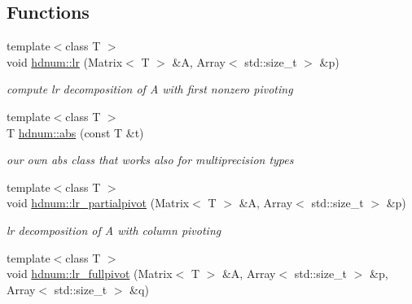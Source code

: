 \subsection*{Functions}
\begin{DoxyCompactItemize}
\item 
\hypertarget{namespacehdnum_aa6579c01f220999e670f956774bd85c7}{
{\footnotesize template$<$class T $>$ }\\void \hyperlink{namespacehdnum_aa6579c01f220999e670f956774bd85c7}{hdnum::lr} (Matrix$<$ T $>$ \&A, Array$<$ std::size\_\-t $>$ \&p)}
\label{namespacehdnum_aa6579c01f220999e670f956774bd85c7}

\begin{DoxyCompactList}\small\item\em compute lr decomposition of A with first nonzero pivoting \item\end{DoxyCompactList}\item 
\hypertarget{namespacehdnum_a9ab161adff3c1341fcf1cffb6b503a3a}{
{\footnotesize template$<$class T $>$ }\\T \hyperlink{namespacehdnum_a9ab161adff3c1341fcf1cffb6b503a3a}{hdnum::abs} (const T \&t)}
\label{namespacehdnum_a9ab161adff3c1341fcf1cffb6b503a3a}

\begin{DoxyCompactList}\small\item\em our own abs class that works also for multiprecision types \item\end{DoxyCompactList}\item 
\hypertarget{namespacehdnum_a1ddad586daab7c3757cb7049a9330f30}{
{\footnotesize template$<$class T $>$ }\\void \hyperlink{namespacehdnum_a1ddad586daab7c3757cb7049a9330f30}{hdnum::lr\_\-partialpivot} (Matrix$<$ T $>$ \&A, Array$<$ std::size\_\-t $>$ \&p)}
\label{namespacehdnum_a1ddad586daab7c3757cb7049a9330f30}

\begin{DoxyCompactList}\small\item\em lr decomposition of A with column pivoting \item\end{DoxyCompactList}\item 
\hypertarget{namespacehdnum_a18307e1ea7ffb87dff8628ccbf723545}{
{\footnotesize template$<$class T $>$ }\\void \hyperlink{namespacehdnum_a18307e1ea7ffb87dff8628ccbf723545}{hdnum::lr\_\-fullpivot} (Matrix$<$ T $>$ \&A, Array$<$ std::size\_\-t $>$ \&p, Array$<$ std::size\_\-t $>$ \&q)}
\label{namespacehdnum_a18307e1ea7ffb87dff8628ccbf723545}


\end{DoxyCompactItemize}
